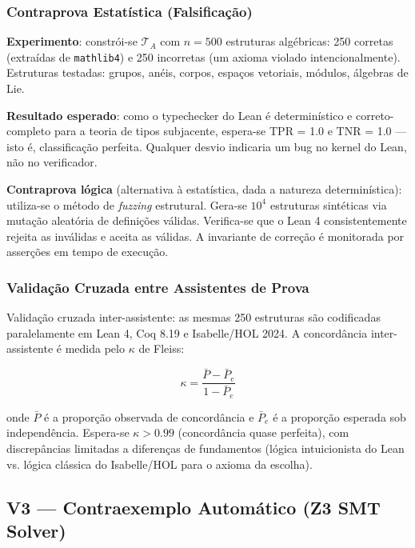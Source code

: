 \documentclass[5p]{elsarticle}
\theoremstyle{remark}
\begin{document}
\subsubsection{Contraprova Estatística (Falsificação)}

\textbf{Experimento}: constrói-se $\mathcal{T}_A$ com $n = 500$ estruturas algébricas: 250 corretas (extraídas de \texttt{mathlib4}) e 250 incorretas (um axioma violado intencionalmente). Estruturas testadas: grupos, anéis, corpos, espaços vetoriais, módulos, álgebras de Lie.

\textbf{Resultado esperado}: como o typechecker do Lean é determinístico e correto-completo para a teoria de tipos subjacente, espera-se TPR = 1.0 e TNR = 1.0 --- isto é, classificação perfeita. Qualquer desvio indicaria um bug no kernel do Lean, não no verificador.

\textbf{Contraprova lógica} (alternativa à estatística, dada a natureza determinística): utiliza-se o método de \textit{fuzzing} estrutural. Gera-se $10^4$ estruturas sintéticas via mutação aleatória de definições válidas. Verifica-se que o Lean 4 consistentemente rejeita as inválidas e aceita as válidas. A invariante de correção é monitorada por asserções em tempo de execução.

\subsubsection{Validação Cruzada entre Assistentes de Prova}

Validação cruzada inter-assistente: as mesmas 250 estruturas são codificadas paralelamente em Lean 4, Coq 8.19 e Isabelle/HOL 2024. A concordância inter-assistente é medida pelo $\kappa$ de Fleiss:

\begin{equation}
\kappa = \frac{\bar{P} - \bar{P}_e}{1 - \bar{P}_e}
\label{eq:c2_fleiss}
\end{equation}

onde $\bar{P}$ é a proporção observada de concordância e $\bar{P}_e$ é a proporção esperada sob independência. Espera-se $\kappa > 0.99$ (concordância quase perfeita), com discrepâncias limitadas a diferenças de fundamentos (lógica intuicionista do Lean vs. lógica clássica do Isabelle/HOL para o axioma da escolha).

\subsection{V3 --- Contraexemplo Automático (Z3 SMT Solver)}
\end{document}
